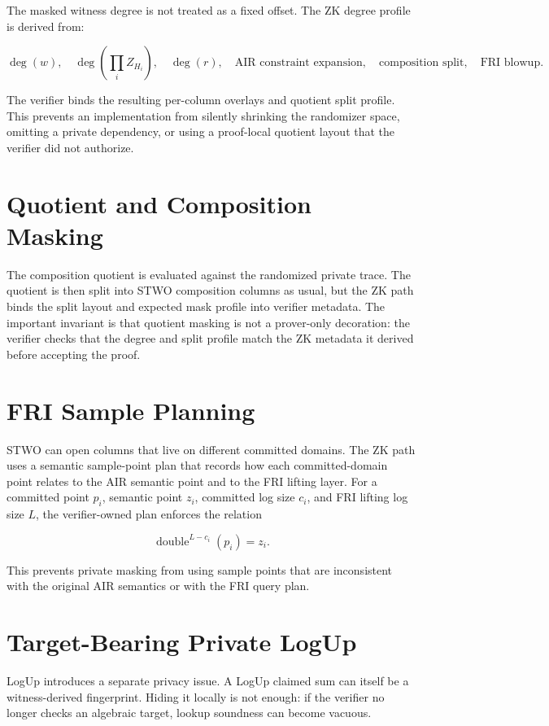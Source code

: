 \documentclass[11pt]{article}
\begin{document}
The masked witness degree is not treated as a fixed offset. The ZK degree profile
is derived from:

\[
    \deg(w),\quad
    \deg\!\left(\prod_i Z_{H_i}\right),\quad
    \deg(r),\quad
    \text{AIR constraint expansion},\quad
    \text{composition split},\quad
    \text{FRI blowup}.
\]

The verifier binds the resulting per-column overlays and quotient split profile.
This prevents an implementation from silently shrinking the randomizer space,
omitting a private dependency, or using a proof-local quotient layout that the
verifier did not authorize.

\section{Quotient and Composition Masking}

The composition quotient is evaluated against the randomized private trace. The
quotient is then split into STWO composition columns as usual, but the ZK path
binds the split layout and expected mask profile into verifier metadata. The
important invariant is that quotient masking is not a prover-only decoration:
the verifier checks that the degree and split profile match the ZK metadata it
derived before accepting the proof.

\section{FRI Sample Planning}

STWO can open columns that live on different committed domains. The ZK path uses
a semantic sample-point plan that records how each committed-domain point relates
to the AIR semantic point and to the FRI lifting layer. For a committed point
\(p_i\), semantic point \(z_i\), committed log size \(c_i\), and FRI lifting log
size \(L\), the verifier-owned plan enforces the relation

\[
    \operatorname{double}^{L-c_i}(p_i) = z_i.
\]

This prevents private masking from using sample points that are inconsistent with
the original AIR semantics or with the FRI query plan.

\section{Target-Bearing Private LogUp}

LogUp introduces a separate privacy issue. A LogUp claimed sum can itself be a
witness-derived fingerprint. Hiding it locally is not enough: if the verifier no
longer checks an algebraic target, lookup soundness can become vacuous.
\end{document}
